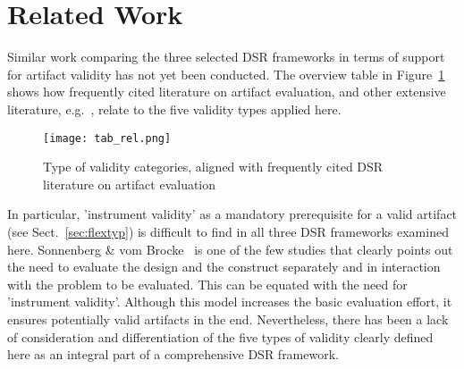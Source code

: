 \section{Related Work}
\label{sec:rel}

Similar work comparing the three selected DSR frameworks in terms of support for artifact validity has not yet been conducted. The overview table in Figure~\ref{fig:tabrel} shows how frequently cited literature on artifact evaluation, and other extensive literature, e.g.~\cite{hevner_design_2004,hevner_design_2010,hevner_transparency_2024,chatterjee_typology_2024,hutchison_evaluations_2012,gregor_building_2009,venable_feds_2016,vaishnavi_design_2004,iivari_paradigmatic_2007,iivari_twelve_2010,prat_taxonomy_2015,kuechler_theory_2008,vijay_k_vaishnavi_design_2015,vom_brocke_introduction_2020,brocke_accumulation_2020,benner-wickner_leitfaden_2020,ralph_empirical_2021,osterle_memorandum_2010,peffers_design_2007}, relate to the five validity types applied here. 

\begin{figure}[htb!]
    \centering
    \texttt{[image: tab\_rel.png]}
    \caption{Type of validity categories, aligned with frequently cited DSR literature on artifact evaluation}
    \label{fig:tabrel}
\end{figure}

In particular, 'instrument validity' as a mandatory prerequisite for a valid artifact (see Sect.~\ref{sec:flextyp}) is difficult to find in all three DSR frameworks examined here. Sonnenberg \& vom Brocke~\cite{hutchison_evaluations_2012} is one of the few studies that clearly points out the need to evaluate the design and the construct separately and in interaction with the problem to be evaluated. This can be equated with the need for 'instrument validity'. Although this model increases the basic evaluation effort, it ensures potentially valid artifacts in the end. Nevertheless, there has been a lack of consideration and differentiation of the five types of validity clearly defined here as an integral part of a comprehensive DSR framework.